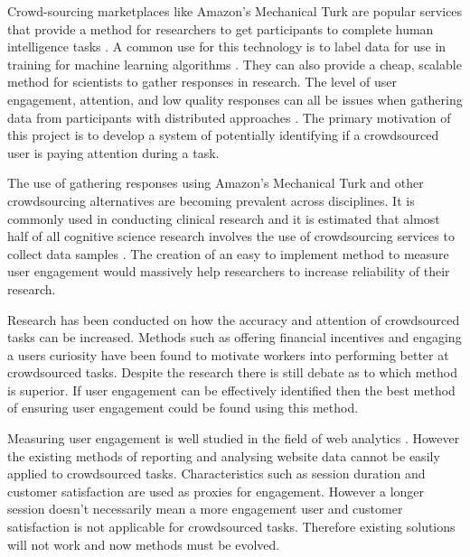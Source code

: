 \documentclass{article}
\begin{document}
Crowd-sourcing marketplaces like Amazon’s Mechanical Turk are popular services that provide a method for researchers to get participants to complete human intelligence tasks \cite{paolacci2010running}. 
A common use for this technology is to label data for use in training for machine learning algorithms \cite{chang2017revolt}.
They can also provide a cheap, scalable method for scientists to gather responses in research.
The level of user engagement, attention, and low quality responses can all be issues when gathering data from participants with distributed approaches \cite{ipeirotis2010quality}.
The primary motivation of this project is to develop a system of potentially identifying if a crowdsourced user is paying attention during a task.

The use of gathering responses using Amazon's Mechanical Turk and other crowdsourcing alternatives are becoming prevalent across disciplines.
It is commonly used in conducting clinical research \cite{chandler2016conducting} and it is estimated that almost half of all cognitive science research involves the use of crowdsourcing services to collect data samples \cite{stewart2017crowdsourcing}.
The creation of an easy to implement method to measure user engagement would massively help researchers to increase reliability of their research.

Research has been conducted on how the accuracy and attention of crowdsourced tasks can be increased.
Methods such as offering financial incentives \cite{ho2015incentivizing} and engaging a users curiosity \cite{law2016curiosity} have been found to motivate workers into performing better at crowdsourced tasks.
Despite the research there is still debate as to which method is superior.
If user engagement can be effectively identified then the best method of ensuring user engagement could be found using this method.


Measuring user engagement is well studied in the field of web analytics \cite{peterson2008measuring}.
However the existing methods of reporting and analysing website data cannot be easily applied to crowdsourced tasks.    
Characteristics such as session duration and customer satisfaction are used as proxies for engagement.
However a longer session doesn't necessarily mean a more engagement user and customer satisfaction is not applicable for crowdsourced tasks.
Therefore existing solutions will not work and now methods must be evolved.
\end{document}
